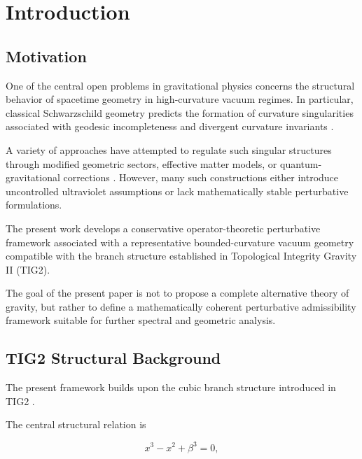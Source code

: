 
\section{Introduction}

\subsection{Motivation}

One of the central open problems in gravitational physics concerns the structural behavior of spacetime geometry in high-curvature vacuum regimes. In particular, classical Schwarzschild geometry predicts the formation of curvature singularities associated with geodesic incompleteness and divergent curvature invariants \cite{wald1984,hawkingellis1973,penrose1965,hawking1970}.

A variety of approaches have attempted to regulate such singular structures through modified geometric sectors, effective matter models, or quantum-gravitational corrections \cite{bardeen1968,dymnikova1992,hayward2006,ansoldi2008}. However, many such constructions either introduce uncontrolled ultraviolet assumptions or lack mathematically stable perturbative formulations.

The present work develops a conservative operator-theoretic perturbative framework associated with a representative bounded-curvature vacuum geometry compatible with the branch structure established in Topological Integrity Gravity II (TIG2).

The goal of the present paper is not to propose a complete alternative theory of gravity, but rather to define a mathematically coherent perturbative admissibility framework suitable for further spectral and geometric analysis.


\subsection{TIG2 Structural Background}

The present framework builds upon the cubic branch structure introduced in TIG2 \cite{tig2}.

The central structural relation is

\begin{equation}
x^3 - x^2 + \beta^3 = 0,
\end{equation}

